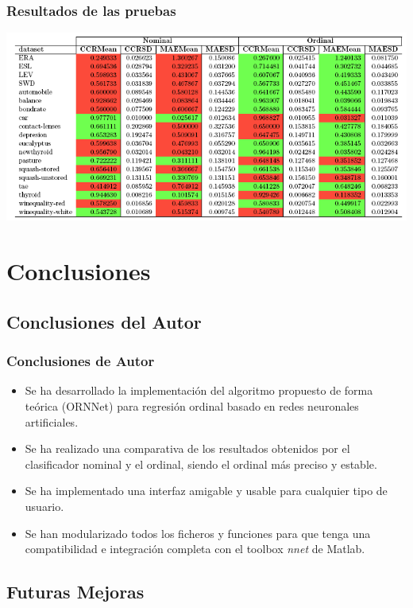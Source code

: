 \documentclass[compress,allowframebreaks]{beamer}
\begin{document}
			\begin{frame}
				\frametitle{\normalsize Resultados de las pruebas}
			
				\includegraphics[scale=0.45]{img/resultados.png}
			\end{frame}

	\section{Conclusiones}

		\subsection{Conclusiones del Autor}

			\begin{frame}
				\frametitle{\normalsize Conclusiones de Autor}
				
				\begin{itemize}\justifying
					\item Se ha desarrollado la implementación del algoritmo propuesto de forma teórica (ORNNet) para regresión ordinal basado en redes neuronales artificiales.
					\item Se ha realizado una comparativa de los resultados obtenidos por el clasificador nominal y el ordinal, siendo el ordinal más preciso y estable.
					\item Se ha implementado una interfaz amigable y usable para cualquier tipo de usuario.
					\item Se han modularizado todos los ficheros y funciones para que tenga una compatibilidad e integración completa con el toolbox \textit{nnet} de Matlab.
				\end{itemize}
			\end{frame}

		\subsection{Futuras Mejoras}
\end{document}
